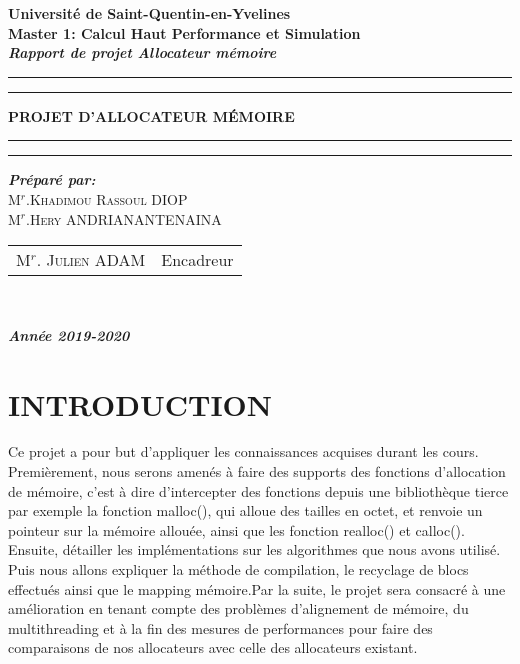 \documentclass[12pt]{article}
\begin{document}
\begin{center}
{\Large {\bf Université de Saint-Quentin-en-Yvelines}}\\
{\Large {\bf {Master 1: Calcul Haut Performance et Simulation }}}\\
 \textbf{{\Huge  \textit{Rapport de projet Allocateur mémoire}}} \\
\hrule
\hrule
{}
{\Huge \textbf{\textsc{ PROJET D'ALLOCATEUR MÉMOIRE }}}\\
\hrule
\hrule
{}
{\textbf{\textit {Préparé par:}}}\\
{\large\textsc{M$^{r}$.Khadimou Rassoul DIOP}}\\
{\large\textsc{M$^{r}$.Hery ANDRIANANTENAINA}}\\
{\large
\begin{tabular}{ll}
M$^{r}$. \textsc{ Julien } ADAM  & Encadreur    \\
\end{tabular}
}\\

{\Large\textbf{\textit{ Année 2019-2020}}}
\end{center}
\newpage

\tableofcontents

\clearpage

\section{INTRODUCTION}
 
{\Large Ce projet a pour but d'appliquer les connaissances acquises durant les cours. Premièrement, nous serons amenés à faire des supports des fonctions d'allocation de mémoire, c'est à dire d'intercepter des fonctions depuis une bibliothèque tierce par exemple la fonction  malloc(), qui alloue des tailles en octet, et renvoie un pointeur sur la mémoire allouée, ainsi que les fonction realloc() et calloc(). Ensuite, détailler les implémentations sur les algorithmes que nous avons utilisé. Puis nous allons expliquer la méthode de compilation, le recyclage de blocs effectués ainsi que le mapping mémoire.Par la suite, le projet sera consacré à une amélioration en tenant compte des problèmes d'alignement de mémoire, du multithreading et à la fin des mesures de performances pour faire des comparaisons de nos allocateurs avec celle des allocateurs existant.}
\end{document}
